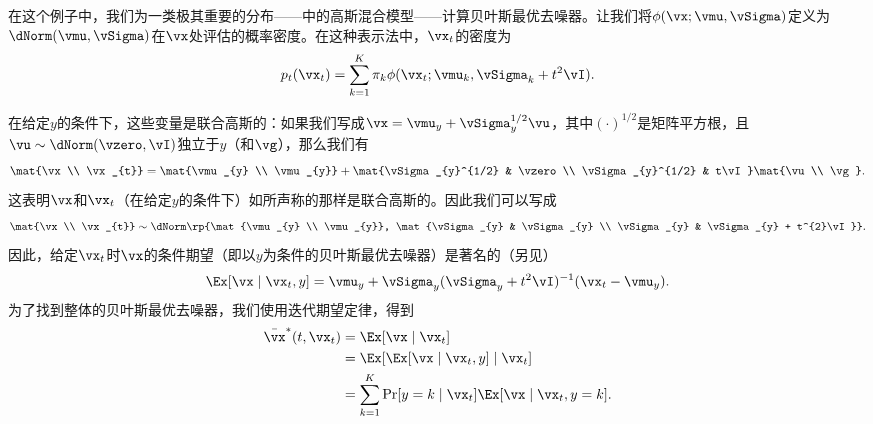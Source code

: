 \documentclass[../../book-main_zh.tex]{subfiles}
\begin{document}
\begin{example}[从高斯混合中去除高斯噪声]\label{example:denoising_gaussian_mixture}
    在这个例子中，我们为一类极其重要的分布——中的高斯混合模型——计算贝叶斯最优去噪器。让我们将\(\phi(\vx ; \vmu, \vSigma)\)定义为\(\dNorm(\vmu, \vSigma)\)在\(\vx\)处评估的概率密度。在这种表示法中，\(\vx_{t}\)的密度为
    \begin{equation}
        p_{t}(\vx_{t}) = \sum_{k = 1}^{K}\pi_{k}\phi(\vx_{t} ;
        \vmu_{k}, \vSigma_{k} + t^{2}\vI).
    \end{equation}

    在给定\(y\)的条件下，这些变量是联合高斯的：如果我们写成\(\vx = \vmu_{y} + \vSigma_{y}^{1/2}\vu\)，其中\((\cdot)^{1/2}\)是矩阵平方根，且\(\vu \sim \dNorm(\vzero, \vI)\)独立于\(y\)（和\(\vg\)），那么我们有
    \begin{equation}
        \mat{\vx \\ \vx_{t}} = \mat{\vmu_{y} \\ \vmu_{y}} +
        \mat{\vSigma_{y}^{1/2} & \vzero \\ \vSigma_{y}^{1/2} &
        t\vI}\mat{\vu \\ \vg}.
    \end{equation}
    这表明\(\vx\)和\(\vx_{t}\)（在给定\(y\)的条件下）如所声称的那样是联合高斯的。因此我们可以写成
    \begin{equation}
        \mat{\vx \\ \vx_{t}} \sim \dNorm\rp{\mat{\vmu_{y}
            \\ \vmu_{y}}, \mat{\vSigma_{y} & \vSigma_{y} \\ \vSigma_{y} &
        \vSigma_{y} + t^{2}\vI}}.
    \end{equation}
    因此，给定\(\vx_{t}\)时\(\vx\)的条件期望（即以\(y\)为条件的贝叶斯最优去噪器）是著名的（另见）
    \begin{equation}
        \Ex[\vx \mid \vx_{t}, y] = \vmu_{y} + \vSigma_{y}(\vSigma_{y}
        + t^{2}\vI)^{-1}(\vx_{t} - \vmu_{y}).
    \end{equation}
    为了找到整体的贝叶斯最优去噪器，我们使用迭代期望定律，得到
    \begin{align}
        \bar{\vx}^{\ast}(t, \vx_{t})
        &= \Ex[\vx \mid \vx_{t}] \\
        &= \Ex[\Ex[\vx \mid \vx_{t}, y] \mid \vx_{t}] \\
        &= \sum_{k = 1}^{K}\Pr[y = k \mid \vx_{t}]\Ex[\vx \mid \vx_{t}, y = k].
    \end{align}

\end{example}
\end{document}
